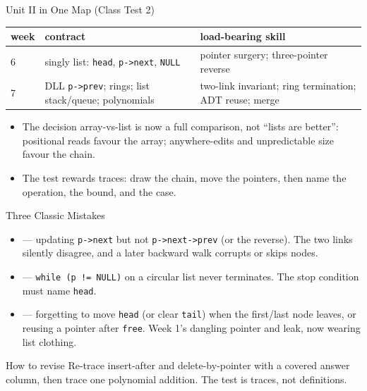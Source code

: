 \documentclass[aspectratio=169]{beamer}
\begin{document}
\begin{frame}{Unit II in One Map (Class Test 2)}
  \begin{center}
  {\footnotesize
  \begin{tabular}{@{}p{1.0cm} p{5.2cm} p{5.2cm}@{}}
    \toprule
    \textbf{week} & \textbf{contract} & \textbf{load-bearing skill} \\
    \midrule
    6 & singly list: \texttt{head}, \texttt{p->next}, \texttt{NULL} &
      pointer surgery; three-pointer reverse \\
    7 & DLL \texttt{p->prev}; rings; list stack/queue; polynomials &
      two-link invariant; ring termination; ADT reuse; merge \\
    \bottomrule
  \end{tabular}}
  \end{center}
  \begin{itemize}
    \item The decision array-vs-list is now a full comparison, not ``lists
      are better'': positional reads favour the array; anywhere-edits and
      unpredictable size favour the chain.
    \item The test rewards traces: draw the chain, move the pointers, then
      name the operation, the bound, and the case.
  \end{itemize}
\end{frame}

\begin{frame}{Three Classic Mistakes}
  \begin{itemize}
    \item {} --- updating \texttt{p->next}
      but not \texttt{p->next->prev} (or the reverse). The two links silently
      disagree, and a later backward walk corrupts or skips nodes.
    \item {} ---
      \texttt{while (p != NULL)} on a circular list never terminates. The stop
      condition must name \texttt{head}.
    \item {} --- forgetting to move \texttt{head}
      (or clear \texttt{tail}) when the first/last node leaves, or reusing a
      pointer after \texttt{free}. Week 1's dangling pointer and leak, now
      wearing list clothing.
  \end{itemize}
  \begin{exampleblock}{How to revise}
    Re-trace insert-after and delete-by-pointer with a covered answer column,
    then trace one polynomial addition. The test is traces, not definitions.
  \end{exampleblock}
\end{frame}
\end{document}
